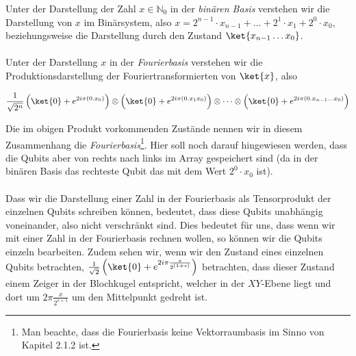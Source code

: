 Unter der Darstellung der Zahl $x \in \mathbb{N}_0$ in der \textit{binären Basis} verstehen wir die Darstellung von $x$ im Binärsystem, also $x = 2^{n - 1}\cdot x_{n - 1} + \dots + 2^1 \cdot x_1 + 2^0 \cdot x_0$, beziehungsweise die Darstellung durch den Zustand $\ket{x_{n - 1}\dots x_0}$.
\paragraph{}
Unter der Darstellung $x$ in der \textit{Fourierbasis} verstehen wir die Produktionsdarstellung der Fouriertransformierten von $\ket{x}$, also 

$$\frac{1}{\sqrt{2^n}}\left(\ket{0} + e^{2i\pi(0.x_0)}\right)\otimes\left(\ket{0} + e^{2i\pi(0.x_1x_0)}\right)\otimes \dots \otimes \left(\ket{0} + e^{2i\pi(0.x_{n - 1}\dots x_0)}\right)$$

Die im obigen Produkt vorkommenden Zustände nennen wir in diesem Zusammenhang die \textit{Fourierbasis}\footnote{Man beachte, dass die Fourierbasis keine Vektorraumbasis im Sinno von Kapitel 2.1.2 ist.}. Hier soll noch darauf hingewiesen werden, dass die Qubits aber von rechts nach links im Array gespeichert sind (da in der binären Basis das rechteste Qubit das mit dem Wert $2^0 \cdot x_0$ ist).

\paragraph{}

Dass wir die Darstellung einer Zahl in der Fourierbasis als Tensorprodukt der einzelnen Qubits schreiben können, bedeutet, dass diese Qubits unabhängig voneinander, also nicht verschränkt sind. Dies bedeutet für uns, dass wenn wir mit einer Zahl in der Fourierbasis rechnen wollen, so können wir die Qubits einzeln bearbeiten. Zudem sehen wir, wenn wir den Zustand eines einzelnen Qubits betrachten, $\frac{1}{\sqrt{2}}\left(\ket{0} + e^{2i\pi\frac{x}{2^{(1 + s)}}}\right)$ betrachten, dass dieser Zustand einem Zeiger in der Blochkugel entspricht, welcher in der $XY$-Ebene liegt und dort um $2\pi\frac{x}{2^{s + 1}}$ um den Mittelpunkt gedreht ist.

